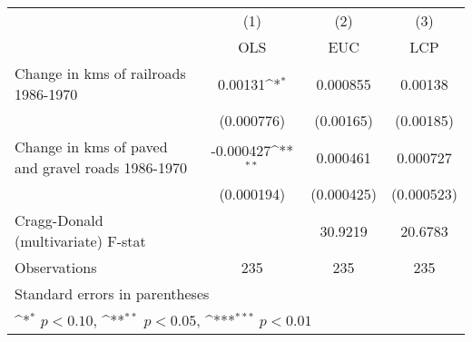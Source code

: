 {
\def\sym#1{\ifmmode^{#1}\else\(^{#1}\)\fi}
\begin{tabular}{l*{3}{c}}
\hline\hline
                &\multicolumn{1}{c}{(1)}&\multicolumn{1}{c}{(2)}&\multicolumn{1}{c}{(3)}\\
                &\multicolumn{1}{c}{OLS}&\multicolumn{1}{c}{EUC}&\multicolumn{1}{c}{LCP}\\
\hline
Change in kms of railroads 1986-1970&  0.00131\sym{*}  & 0.000855         &  0.00138         \\
                &(0.000776)         &(0.00165)         &(0.00185)         \\
[1em]
Change in kms of paved and gravel roads 1986-1970&-0.000427\sym{**} & 0.000461         & 0.000727         \\
                &(0.000194)         &(0.000425)         &(0.000523)         \\
\hline
Cragg-Donald (multivariate) F-stat&                  &  30.9219         &  20.6783         \\
Observations    &      235         &      235         &      235         \\
\hline\hline
\multicolumn{4}{l}{\footnotesize Standard errors in parentheses}\\
\multicolumn{4}{l}{\footnotesize \sym{*} \(p<0.10\), \sym{**} \(p<0.05\), \sym{***} \(p<0.01\)}\\
\end{tabular}
}
